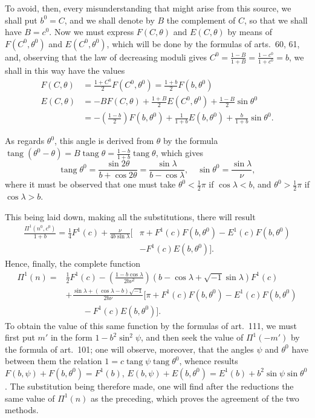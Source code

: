 \documentclass{article}
\begin{document}
To avoid, then, every misunderstanding that might arise from this source, we shall put $b^{0}=C$, and we shall denote by $B$ the complement of $C$, so that we shall have $B=c^{0}$. Now we must express $F(C,\theta)$ and $E(C,\theta)$ by means of $F(C^{0},\theta^{0})$ and $E(C^{0},\theta^{0})$, which will be done by the formulas of arts.\ 60, 61, and, observing that the law of decreasing moduli gives $C^{0}=\frac{1-B}{1+B}=\frac{1-c^{0}}{1+c^{0}}=b$, we shall in this way have the values
\[ \begin{aligned} F(C,\theta)&=\frac{1+C^{0}}{2}F(C^{0},\theta^{0})=\frac{1+b}{2}F(b,\theta^{0})\\ E(C,\theta)&=-BF(C,\theta)+\frac{1+B}{2}E(C^{0},\theta^{0})+\frac{1-B}{2}\sin\theta^{0}\\ &=-\left(\frac{1-b}{2}\right)F(b,\theta^{0})+\frac{1}{1+b}E(b,\theta^{0})+\frac{b}{1+b}\sin\theta^{0}. \end{aligned} \]

As regards $\theta^{0}$, this angle is derived from $\theta$ by the formula $\operatorname{tang}(\theta^{0}-\theta)=B\operatorname{tang}\theta=\frac{1-b}{1+b}\operatorname{tang}\theta$, which gives
\[ \operatorname{tang}\theta^{0}=\frac{\sin 2\theta}{b+\cos 2\theta}=\frac{\sin\lambda}{b-\cos\lambda},\quad \sin\theta^{0}=\frac{\sin\lambda}{\nu}, \]
where it must be observed that one must take $\theta^{0}<\frac{1}{2}\pi$ if $\cos\lambda<b$, and $\theta^{0}>\frac{1}{2}\pi$ if $\cos\lambda>b$.

This being laid down, making all the substitutions, there will result
\[ \begin{aligned} \frac{\Pi^{1}(n^{0},c^{0})}{1+b}=\tfrac{1}{4}F^{1}(c)+\frac{\nu}{4b\sin\lambda}[&\pi+F^{1}(c)F(b,\theta^{0})-E^{1}(c)F(b,\theta^{0})\\ &-F^{1}(c)E(b,\theta^{0})]. \end{aligned} \]
Hence, finally, the complete function
\[ \begin{aligned} \Pi^{1}(n)={}&\tfrac{1}{2}F^{1}(c)-\left(\frac{1-b\cos\lambda}{2b\nu^{2}}\right)(b-\cos\lambda+\sqrt{-1}\sin\lambda)F^{1}(c)\\ &+\frac{\sin\lambda+(\cos\lambda-b)\sqrt{-1}}{2b\nu}[\pi+F^{1}(c)F(b,\theta^{0})-E^{1}(c)F(b,\theta^{0})\\ &\qquad-F^{1}(c)E(b,\theta^{0})]. \end{aligned} \]
To obtain the value of this same function by the formulas of art.\ 111, we must first put $m'$ in the form $1-b^{2}\sin^{2}\psi$, and then seek the value of $\Pi^{1}(-m')$ by the formula of art.\ 101; one will observe, moreover, that the angles $\psi$ and $\theta^{0}$ have between them the relation $1=c\operatorname{tang}\psi\operatorname{tang}\theta^{0}$, whence results $F(b,\psi)+F(b,\theta^{0})=F^{1}(b)$, $E(b,\psi)+E(b,\theta^{0})=E^{1}(b)+b^{2}\sin\psi\sin\theta^{0}$. The substitution being therefore made, one will find after the reductions the same value of $\Pi^{1}(n)$ as the preceding, which proves the agreement of the two methods.
\end{document}
